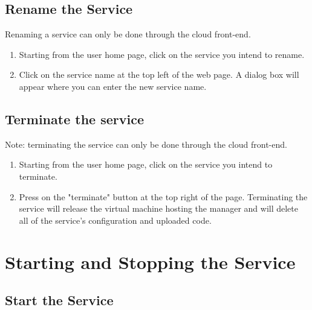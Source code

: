 \documentclass[10pt]{article}
\begin{document}
\subsection{Rename the Service}
Renaming a service can only be done through the cloud front-end. 
\begin{enumerate}
\item Starting from the user home page, click on the service you intend to
      rename.
\item Click on the service name at the top left of the web
      page. A dialog box will appear where you can enter the new service
      name.
\end{enumerate}

\subsection{Terminate the service}
Note: terminating the service can only be done through the cloud front-end.
\begin{enumerate}
\item Starting from the user home page, click on the service you intend to
      terminate.
\item Press on the "terminate" button at the top right of the page.
      Terminating the service will release the virtual machine hosting
      the manager and will delete all of the service's configuration and
      uploaded code.
\end{enumerate}

\section{Starting and Stopping the Service}

\subsection{Start the Service}
\end{document}
